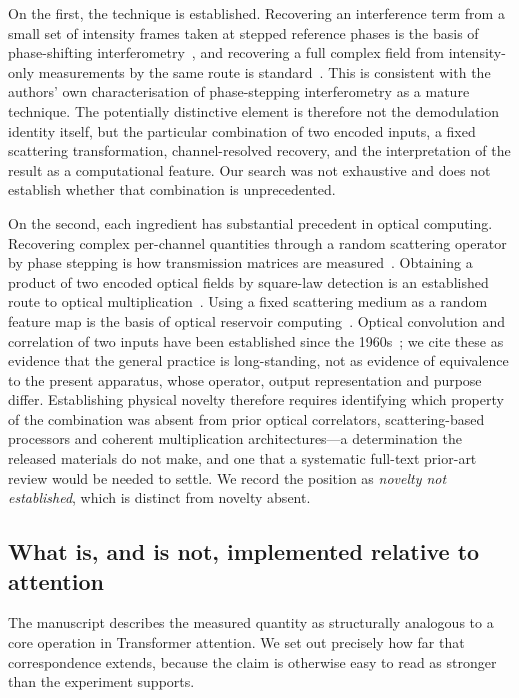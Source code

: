\documentclass[11pt,a4paper]{article}
\begin{document}
On the first, the technique is established. Recovering an interference term
from a small set of intensity frames taken at stepped reference phases is the
basis of phase-shifting interferometry~\cite{bruning}, and recovering a full
complex field from intensity-only measurements by the same route is
standard~\cite{yamaguchi}. This is consistent with the authors' own
characterisation of phase-stepping interferometry as a mature technique.
The potentially distinctive element is therefore not the demodulation identity
itself, but the particular combination of two encoded inputs, a fixed
scattering transformation, channel-resolved recovery, and the interpretation
of the result as a computational feature. Our search was not exhaustive and
does not establish whether that combination is unprecedented.

On the second, each ingredient has substantial precedent in optical computing.
Recovering complex per-channel quantities through a random scattering operator
by phase stepping is how transmission matrices are
measured~\cite{popoff}. Obtaining a product of two encoded optical fields by
square-law detection is an established route to optical
multiplication~\cite{hamerly}. Using a fixed scattering medium as a random
feature map is the basis of optical reservoir computing~\cite{rafayelyan}.
Optical convolution and correlation of two inputs have been established since
the 1960s~\cite{vanderlugt,weaver}; we cite these as evidence that the general
practice is long-standing, not as evidence of equivalence to the present
apparatus, whose operator, output representation and purpose differ.
Establishing physical novelty therefore requires identifying which property of
the combination was absent from prior optical correlators, scattering-based
processors and coherent multiplication architectures---a determination the
released materials do not make, and one that a systematic full-text prior-art
review would be needed to settle. We record the position as \emph{novelty not
established}, which is distinct from novelty absent.

\subsection{What is, and is not, implemented relative to attention}
\label{sec:attention}

The manuscript describes the measured quantity as structurally analogous to a
core operation in Transformer attention. We set out precisely how far that
correspondence extends, because the claim is otherwise easy to read as
stronger than the experiment supports.
\end{document}
